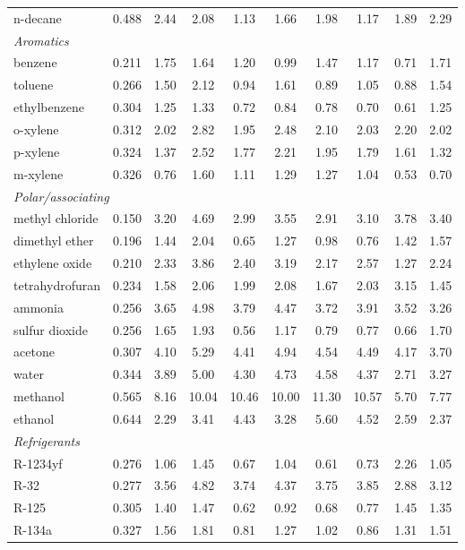 \begin{table}[H]
\begin{tabular}{lccccccccc}
n-decane & 0.488 & 2.44 & 2.08 & 1.13 & 1.66 & 1.98 & 1.17 & 1.89 & 2.29 \\
\multicolumn{10}{l}{\emph{Aromatics}} \\
benzene & 0.211 & 1.75 & 1.64 & 1.20 & 0.99 & 1.47 & 1.17 & 0.71 & 1.71 \\
toluene & 0.266 & 1.50 & 2.12 & 0.94 & 1.61 & 0.89 & 1.05 & 0.88 & 1.54 \\
ethylbenzene & 0.304 & 1.25 & 1.33 & 0.72 & 0.84 & 0.78 & 0.70 & 0.61 & 1.25 \\
o-xylene & 0.312 & 2.02 & 2.82 & 1.95 & 2.48 & 2.10 & 2.03 & 2.20 & 2.02 \\
p-xylene & 0.324 & 1.37 & 2.52 & 1.77 & 2.21 & 1.95 & 1.79 & 1.61 & 1.32 \\
m-xylene & 0.326 & 0.76 & 1.60 & 1.11 & 1.29 & 1.27 & 1.04 & 0.53 & 0.70 \\
\multicolumn{10}{l}{\emph{Polar/associating}} \\
methyl chloride & 0.150 & 3.20 & 4.69 & 2.99 & 3.55 & 2.91 & 3.10 & 3.78 & 3.40 \\
dimethyl ether & 0.196 & 1.44 & 2.04 & 0.65 & 1.27 & 0.98 & 0.76 & 1.42 & 1.57 \\
ethylene oxide & 0.210 & 2.33 & 3.86 & 2.40 & 3.19 & 2.17 & 2.57 & 1.27 & 2.24 \\
tetrahydrofuran & 0.234 & 1.58 & 2.06 & 1.99 & 2.08 & 1.67 & 2.03 & 3.15 & 1.45 \\
ammonia & 0.256 & 3.65 & 4.98 & 3.79 & 4.47 & 3.72 & 3.91 & 3.52 & 3.26 \\
sulfur dioxide & 0.256 & 1.65 & 1.93 & 0.56 & 1.17 & 0.79 & 0.77 & 0.66 & 1.70 \\
acetone & 0.307 & 4.10 & 5.29 & 4.41 & 4.94 & 4.54 & 4.49 & 4.17 & 3.70 \\
water & 0.344 & 3.89 & 5.00 & 4.30 & 4.73 & 4.58 & 4.37 & 2.71 & 3.27 \\
methanol & 0.565 & 8.16 & 10.04 & 10.46 & 10.00 & 11.30 & 10.57 & 5.70 & 7.77 \\
ethanol & 0.644 & 2.29 & 3.41 & 4.43 & 3.28 & 5.60 & 4.52 & 2.59 & 2.37 \\
\multicolumn{10}{l}{\emph{Refrigerants}} \\
R-1234yf & 0.276 & 1.06 & 1.45 & 0.67 & 1.04 & 0.61 & 0.73 & 2.26 & 1.05 \\
R-32 & 0.277 & 3.56 & 4.82 & 3.74 & 4.37 & 3.75 & 3.85 & 2.88 & 3.12 \\
R-125 & 0.305 & 1.40 & 1.47 & 0.62 & 0.92 & 0.68 & 0.77 & 1.45 & 1.35 \\
R-134a & 0.327 & 1.56 & 1.81 & 0.81 & 1.27 & 1.02 & 0.86 & 1.31 & 1.51 \\
\bottomrule
\end{tabular}
\end{table}
